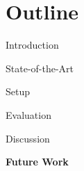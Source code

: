 \section{Outline}
\begin{frame}{}
    \vspace{1.5cm}
    \begin{itemize}
        \setlength\itemsep{2em}
        
        {\color{TUMBlack} 
            \item \large Introduction
            \item \large State-of-the-Art
            \item \large Setup
            \item \large Evaluation
            \item \large Discussion
        }
        \item \large \textbf{Future Work}
    \end{itemize}
\end{frame}